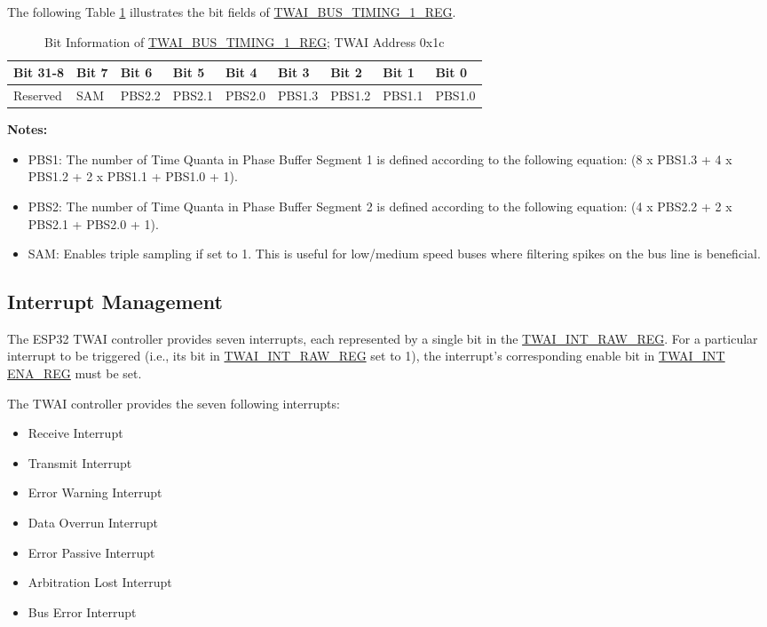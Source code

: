 \documentclass[main\_\_EN.tex]{subfiles}
\begin{document}
The following Table \ref{table:Bit_timing_1} illustrates the bit fields of \hyperref[regdesc:TWAIBUSTIMING1REG]{TWAI\_BUS\_TIMING\_1\_REG}.

\begin{longtable}[c]{|p{1.4cm}|p{1.4cm}|p{1.4cm}|p{1.4cm}|p{1.4cm}|p{1.4cm}|p{1.4cm}|p{1.4cm}|p{1.4cm}|}
    \caption{Bit Information of \hyperref[regdesc:TWAIBUSTIMING1REG]{TWAI\_BUS\_TIMING\_1\_REG}; TWAI Address 0x1c}
    \label{table:Bit_timing_1}\\
    \hline
       \rowcolor{lightgray}
   Bit 31-8 & Bit 7 & Bit 6 & Bit 5 & Bit 4 & Bit 3 & Bit 2 & Bit 1 & Bit 0\\\hline
   Reserved & SAM & PBS2.2 & PBS2.1 & PBS2.0 & PBS1.3 &PBS1.2 & PBS1.1 & PBS1.0\\
    \hline
\end{longtable}
\vspace{-1.5em}
{\bfseries Notes:}\\
\begin{itemize}
    \item PBS1: The number of Time Quanta in Phase Buffer Segment 1 is defined according to the following equation: (8 x PBS1.3 + 4 x PBS1.2 + 2 x PBS1.1 + PBS1.0 + 1).
    \item PBS2: The number of Time Quanta in Phase Buffer Segment 2 is defined according to the following equation: (4 x PBS2.2 + 2 x PBS2.1 + PBS2.0 + 1).
    \item SAM: Enables triple sampling if set to 1. This is useful for low/medium speed buses where filtering spikes on the bus line is beneficial.
\end{itemize}

\subsection{Interrupt Management}
\label{subsubsec:interrupt-management}
The ESP32 TWAI controller provides seven interrupts, each represented by a single bit in the \hyperref[regdesc:TWAIINTRAWREG]{TWAI\_INT\_RAW\_REG}. For a particular interrupt to be triggered (i.e., its bit in \hyperref[regdesc:TWAIINTRAWREG]{TWAI\_INT\_RAW\_REG} set to 1), the interrupt’s corresponding enable bit in \hyperref[regdesc:TWAIINT ENAREG]{TWAI\_INT ENA\_REG} must be set.

The TWAI controller provides the seven following interrupts:

\begin{itemize}
    \item Receive Interrupt
    \item Transmit Interrupt
    \item Error Warning Interrupt
    \item Data Overrun Interrupt
    \item Error Passive Interrupt
    \item Arbitration Lost Interrupt
    \item Bus Error Interrupt
\end{itemize}
\end{document}
